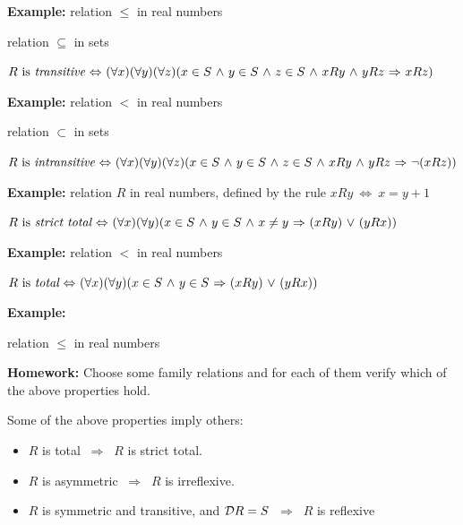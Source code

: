 \documentclass[11pt,paper=b5,footinclude,headinclude]{scrbook} %
\def\ali {{~\vee~}}
\def\inn {{~\wedge~}}
\def\sledi {{~\Rightarrow~}}
\def\cee {{~\Leftrightarrow~}}
\theoremstyle{remark}
\theoremstyle{definition} %
\theoremstyle{theorem} %
\begin{document}
\textbf{ Example:}
relation  $\le$ in real numbers

relation  $\subseteq$ in sets

\bigskip

$R \textrm{ is {\em transitive}} \cee (\forall x)(\forall y)(\forall z)(x\in S\inn y\in S\inn z\in S\inn xRy\inn yRz\sledi xRz)$


\textbf{ Example:} relation  $<$ in real numbers

relation  $\subset$ in sets

\bigskip

$R \textrm{ is {\em intransitive}} \cee (\forall x)(\forall y)(\forall z)(x\in S\inn y\in S\inn z\in S\inn xRy\inn yRz\sledi \neg(xRz))$


\textbf{ Example:}
relation  $R$ in real numbers, defined by the rule $xRy \cee x = y + 1$

\bigskip

$R \textrm{ is {\em strict total}} \cee (\forall x)(\forall y)(x\in S\inn y\in S
\inn x\neq y\sledi (xRy)\ali (yRx))$


\textbf{ Example:}
relation  $<$ in real numbers

\bigskip

$R \textrm{ is {\em total}} \cee (\forall x)(\forall y)(x\in S\inn y\in S
\sledi (xRy)\ali (yRx))$


\textbf{ Example:}

relation  $\le$ in real numbers

\bigskip
\textbf{ Homework:}
Choose some family relations and for each of them verify which of the above properties hold.

\bigskip
Some of the above properties imply others:
\begin{itemize}
  \item $R$ is total $\sledi$ $R$ is strict total.
  \item $R$ is asymmetric $\sledi$ $R$ is irreflexive.
  \item $R$ is symmetric and transitive, and ${\cal D}R = S$ $\sledi$ $R$ is reflexive
\end{itemize}
\end{document}
